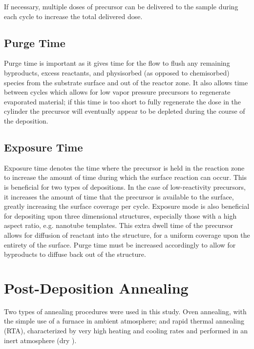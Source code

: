 If necessary, multiple doses of precursor can be delivered to the sample during each cycle to increase the total delivered dose.


\subsection{Purge Time}

Purge time is important as it gives time for the  flow to flush any remaining byproducts, excess reactants, and physisorbed (as opposed to chemisorbed) species from the substrate surface and out of the reactor zone. It also allows time between cycles which allows for low vapor pressure precursors to regenerate evaporated material; if this time is too short to fully regenerate the dose in the cylinder the precursor will eventually appear to be depleted during the course of the deposition. 


\subsection{Exposure Time}

Exposure time denotes the time where the precursor is held in the reaction zone to increase the amount of time during which the surface reaction can occur. This is beneficial for two types of depositions. In the case of low-reactivity precursors, it increases the amount of time that the precursor is available to the surface, greatly increasing the surface coverage per cycle. Exposure mode is also beneficial for depositing upon three dimensional structures, especially those with a high aspect ratio, e.g. nanotube templates. This extra dwell time of the precursor allows for diffusion of reactant into the structure, for a uniform coverage upon the entirety of the surface. Purge time must be increased accordingly to allow for byproducts to diffuse back out of the structure. 


\section{Post-Deposition Annealing}
\label{sec:SampFab-Annealing}

Two types of annealing procedures were used in this study. Oven annealing, with the simple use of a furnace in ambient atmosphere; and rapid thermal annealing (RTA), characterized by very high heating and cooling rates and performed in an inert atmosphere (dry ). 


